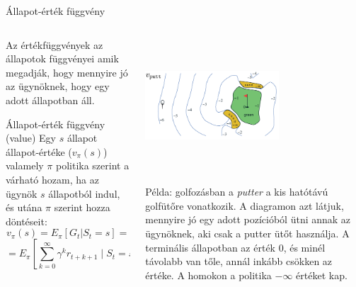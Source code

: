 \documentclass[english, aspectratio=169]{beamer}
\begin{document}
\begin{frame}{Állapot-érték függvény}
\begin{columns}
\begin{column}{.5\textwidth}
Az értékfüggvények az állapotok függvényei amik megadják, hogy mennyire jó az ügynöknek, hogy egy adott állapotban áll.
\begin{block}{Állapot-érték függvény (value)}
Egy $s$ állapot állapot-értéke ($v_{\pi}(s)$) valamely $\pi$ politika szerint a várható hozam, ha az ügynök $s$ állapotból indul, és utána $\pi$ szerint hozza döntéseit:\\
\[
v_{\pi}(s)=E_{\pi}\left[G_{t}|S_{t}=s\right]=
\]
\[
=E_{\pi}\left[\sum_{k=0}^{\infty}\gamma^{k}r_{t+k+1}\mid S_{t}=s\right]
\]
\end{block}
\end{column}
\begin{column}{.5\textwidth}
\begin{center}
\includegraphics[width=5cm, height=5cm, keepaspectratio]{images/reinf_9.png}
\end{center}
\begin{small}
Példa: golfozásban a \emph{putter} a kis hatótávú golfütőre vonatkozik. A diagramon azt látjuk, mennyire jó egy adott pozícióból ütni annak az ügynöknek, aki csak a putter ütőt használja. A terminális állapotban az érték $0$, és minél távolabb van tőle, annál inkább csökken az értéke. A homokon a politika $-\infty$ értéket kap.
\end{small}
\end{column}
\end{columns}
\end{frame}
\end{document}
